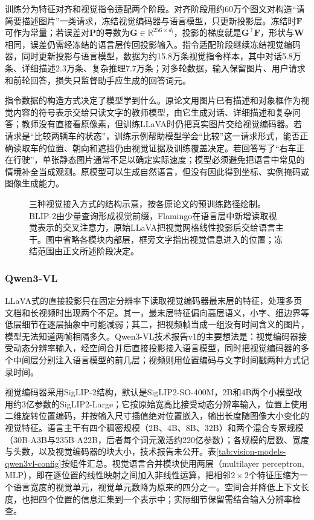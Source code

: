 训练分为特征对齐和视觉指令适配两个阶段。对齐阶段用约60万个图文对构造“请简要描述图片”一类请求，冻结视觉编码器与语言模型，只更新投影层。冻结时$\bm F$可作为常量；若误差对$\bm P$的导数为$\bm G\in\mathbb R^{256\times d_{\mathrm l}}$，投影的梯度就是$\bm G^\top\bm F$，形状与$\bm W$相同，误差仍需经冻结的语言层传回投影输入。指令适配阶段继续冻结视觉编码器，同时更新投影与语言模型，数据为约15.8万条视觉指令样本，其中对话5.8万条、详细描述2.3万条、复杂推理7.7万条；对多轮数据，输入保留图片、用户请求和前轮回答，损失只监督助手应生成的回答词元。

指令数据的构造方式决定了模型学到什么。原论文用图片已有描述和对象框作为视觉内容的符号表示交给只读文字的教师模型，由它生成对话、详细描述和复杂问答；教师没有直接看原像素，但训练LLaVA时仍把真实图片交给视觉编码器。若请求是“比较两辆车的状态”，训练示例帮助模型学会“比较”这一请求形式，能否正确读取车的位置、朝向和遮挡仍由视觉证据及训练覆盖决定。若回答写了“右车正在行驶”，单张静态图片通常不足以确定实际速度；模型必须避免把语言中常见的情境补全当成观测。原模型可以生成自然语言，但没有因此得到坐标、实例掩码或图像生成能力。

\begin{figure}[tbp]
  \centering
  
  \caption{三种视觉接入方式的结构示意，按各原论文的预训练路径绘制。BLIP-2由少量查询形成视觉前缀，Flamingo在语言层中新增读取视觉表示的交叉注意力，原始LLaVA把视觉网格线性投影后交给语言主干。图中省略各模块内部层，框旁文字指出视觉信息进入的位置；冻结范围由正文所述阶段决定。}
  \label{fig:vision-language-connectors}
\end{figure}
\FloatBarrier

\subsubsection{Qwen3-VL}
\label{sec:vision-models-qwen3vl}

LLaVA式的直接投影只在固定分辨率下读取视觉编码器最末层的特征，处理多页文档和长视频时出现两个不足。其一，最末层特征偏向高层语义，小字、细边界等低层细节在逐层抽象中可能减弱；其二，把视频帧当成一组没有时间含义的图片，模型无法知道两帧相隔多久。Qwen3-VL技术报告v1的主要想法是：视觉编码器接受动态分辨率输入，经空间合并后直接投影接入语言模型，同时把视觉编码器的多个中间层分别注入语言模型的前几层；视频则用位置编码与文字时间戳两种方式记录时间。

视觉编码器采用SigLIP-2结构，默认是SigLIP2-SO-400M，2B和4B两个小模型改用约3亿参数的SigLIP2-Large；它按原始宽高比接受动态分辨率输入，位置上使用二维旋转位置编码，并按输入尺寸插值绝对位置嵌入，输出长度随图像大小变化的视觉特征。语言主干有四个稠密规模（2B、4B、8B、32B）和两个混合专家规模（30B-A3B与235B-A22B，后者每个词元激活约220亿参数）；各规模的层数、宽度与头数，以及视觉编码器的块大小，技术报告未公开。表\ref{tab:vision-models-qwen3vl-config}按组件汇总。视觉语言合并模块使用两层（multilayer perceptron, MLP），即在逐位置的线性映射之间加入非线性运算，把相邻$2\times2$个特征压缩为一个语言宽度的视觉单元，视觉单元数降为原来的四分之一。空间合并降低上下文长度，也把四个位置的信息汇集到一个表示中；实际细节保留需结合输入分辨率检查。

